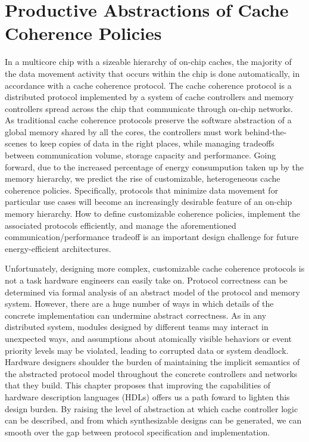 \chapter{Productive Abstractions of Cache Coherence Policies}
\label{c.coherence}

In a multicore chip with a sizeable hierarchy of on-chip caches,
the majority of the data movement activity that occurs within the chip
is done automatically, in accordance with a cache coherence protocol.
The cache coherence protocol is a distributed protocol implemented by a system of cache controllers and memory controllers
spread across the chip that communicate through on-chip networks.
As traditional cache coherence protocols preserve the software abstraction of a global memory shared by all the cores,
the controllers must work behind-the-scenes to keep copies of data in the right places,
while managing tradeoffs between communication volume, storage capacity and performance.
Going forward, due to the increased percentage of energy consumpution taken up by the memory hierarchy,
we predict the rise of customizable, heterogeneous cache coherence policies.
Specifically, protocols that minimize data movement for particular use cases
will become an increasingly desirable feature of an on-chip memory hierarchy.
How to define customizable coherence policies, implement the associated protocols efficiently,
and manage the aforementioned communication/performance tradeoff is an important design challenge for future energy-efficient architectures. 

Unfortunately, designing more complex, customizable cache coherence protocols is not a task hardware engineers can easily take on.
Protocol correctness can be determined via formal analysis of an abstract model of the protocol and memory system.
However, there are a huge number of ways in which details of the concrete implementation can undermine abstract correctness.
As in any distributed system, modules designed by different teams may interact in unexpected ways,
and assumptions about atomically visible behaviors or event priority levels may be violated,
leading to corrupted data or system deadlock.
Hardware designers shoulder the burden of maintaining the implicit semantics of the abstracted protocol model
throughout the concrete controllers and networks that they build.
This chapter proposes that improving the capabilities of hardware description languages (HDLs) offers us a path foward to lighten this design burden.
By raising the level of abstraction at which cache controller logic can be described,
and from which synthesizable designs can be generated,
we can smooth over the gap between protocol specification and implementation.

